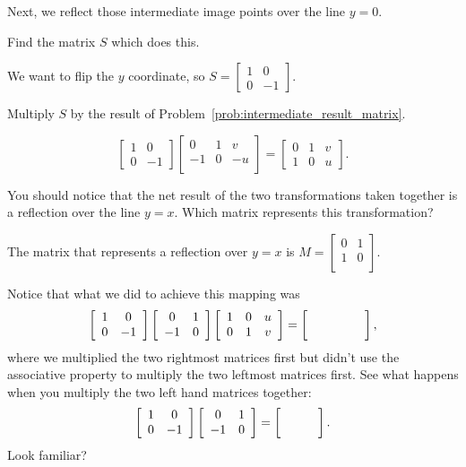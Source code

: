 \documentclass[../key.tex]{subfiles}
\begin{document}
\begin{inner_problem}
\item Next, we reflect those intermediate image points over the line $y=0$.
\end{inner_problem}

\begin{iinner_problem}[start=1]
\item Find the matrix $S$ which does this.
\end{iinner_problem}

We want to flip the $y$ coordinate, so $S=\begin{bmatrix} 1 & 0 \\ 0 & -1 \end{bmatrix}$.

\begin{iinner_problem}
\item Multiply $S$ by the result of Problem~\ref{prob:intermediate_result_matrix}.
\end{iinner_problem}

$$\begin{bmatrix} 1 & 0 \\ 0 & -1 \end{bmatrix} \begin{bmatrix}0 & 1 & v \\ -1 & 0 & -u \\ \end{bmatrix}=\begin{bmatrix} 0 & 1 & v \\ 1 & 0 & u \end{bmatrix}.$$

\begin{inner_problem}
\item You should notice that the net result of the two transformations taken together is a reflection over the line $y=x$. Which matrix represents this transformation?
\end{inner_problem}

The matrix that represents a reflection over $y=x$ is $M=\begin{bmatrix} 0 & 1 \\ 1 & 0 \\ \end{bmatrix}$.

\begin{inner_problem}
\item Notice that what we did to achieve this mapping was $$\twomat{1}{0}{0}{-1}\twomat{0}{1}{-1}{0}\left[\begin{array}{ccc} 1 & 0 & u \\ 0 & 1 & v \end{array}\right]=\left[\phantom{\begin{array}{ccc} 1 & 0 & u \\ 0 & 1 & v \end{array}}\right],$$
where we multiplied the two rightmost matrices first but didn't use the associative property to multiply the two leftmost matrices first. See what happens when you multiply the two left hand matrices together: $$\twomat{1}{0}{0}{-1}\twomat{0}{1}{-1}{0}=\blanktwomat.$$ Look familiar?
\end{inner_problem}
\end{document}
